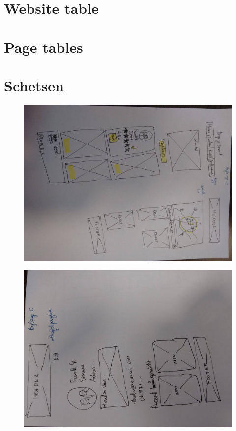 \documentclass[a4paper,12pt]{article}
\begin{document}
\section{Website table}



\section{Page tables}





\section{Schetsen}

\begin{figure}[H]
  \centering
  \includegraphics[width=\textwidth,keepaspectratio]{./schetsen.jpg}
\end{figure}

\begin{figure}[H]
  \centering
  \includegraphics[width=\textwidth,keepaspectratio]{./schetsen-profiel.jpg}
\end{figure}
\end{document}
